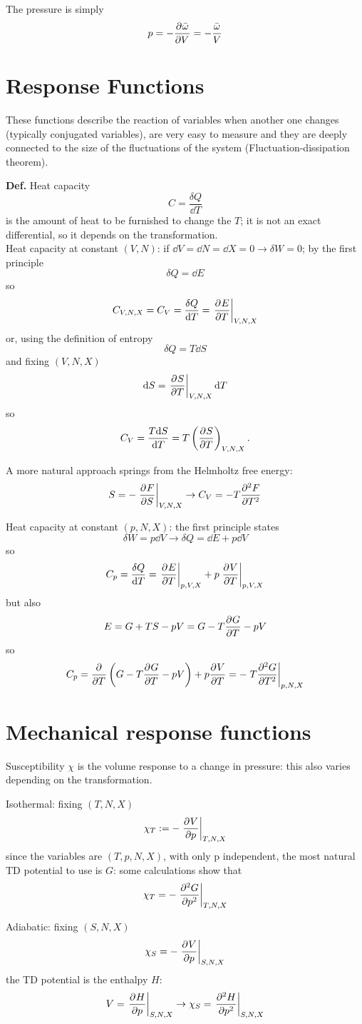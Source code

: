 The pressure is simply
$$ p = -\pdv[]{\bar\omega}{V} = -\frac{\bar\omega}{V}$$
\section{Response Functions}
These functions describe the reaction of variables when another one changes (typically
conjugated variables), are very easy to measure and they are deeply connected to the
size of the fluctuations of the system (Fluctuation-dissipation theorem).

\textbf{Def.} Heat capacity
$$C = \frac{\delta Q}{\dd T}$$
is the amount of heat to be furnished to change the $T$; it is not an exact
differential, so it depends on the transformation.\\
Heat capacity at constant $(V,N)$: if $\dd V = \dd N = \dd X = 0 \rightarrow\delta W=0$;
by the first principle
$$\delta Q = \dd E$$
so
$$C_{V,N,X} = C_V = \frac{\delta Q}{\dd T} = \eval{\pdv[]{E}{T}}_{V,N,X}$$
or, using the definition of entropy
$$\delta Q = T\dd S$$
and fixing $(V,N,X)$
$$\dd S = \eval{\pdv[]{S}{T}}_{V,N,X}\dd T$$
so
$$C_V = \frac{T\dd S}{\dd T} = T \left(\pdv[]{S}{T}\right)_{V,N,X}.$$

A more natural approach springs from the Helmholtz free energy:
$$S = -\eval{\pdv[]{F}{S}}_{V,N,X}\rightarrow C_V = - T \pdv[2]{F}{T}$$

Heat capacity at constant $(p,N,X)$: the first principle states
$$\delta W = p \dd V \rightarrow \delta Q = \dd E +p\dd V$$
so
$$C_p = \frac{\delta Q}{\dd T} = \eval{\pdv[]{E}{T}}_{p,V,X} +
p\eval{\pdv[]{V}{T}}_{p,V,X}$$
but also
$$E = G +TS-pV = G - T\pdv[]{G}{T}-pV$$
so
$$C_p = \pdv[]{}{T}\left(G-T\pdv[]{G}{T} -pV\right) + p\pdv[]{V}{T} = -
\eval{T\pdv[2]{G}{T}}_{p,N,X}$$
\section{Mechanical response functions}
Susceptibility $\chi$ is the volume response to a change in pressure: this also varies
depending on the transformation.

Isothermal: fixing $(T,N,X)$
$$\chi_T := -\eval{\pdv[]{V}{p}}_{T,N,X}$$
since the variables are $(T,p,N,X)$, with only p independent, the most natural
TD potential to use is $G$: some calculations show that
$$\chi_T = - \eval{\pdv[2]{G}{p}}_{T,N,X}$$

Adiabatic: fixing $(S,N,X)$
$$\chi_S = -\eval{\pdv[]{V}{p}}_{S,N,X}$$
the TD potential is the enthalpy $H$:
$$V = \eval{\pdv[]{H}{p}}_{S,N,X} \rightarrow \chi_S = \eval{\pdv[2]{H}{p}}_{S,N,X}$$

